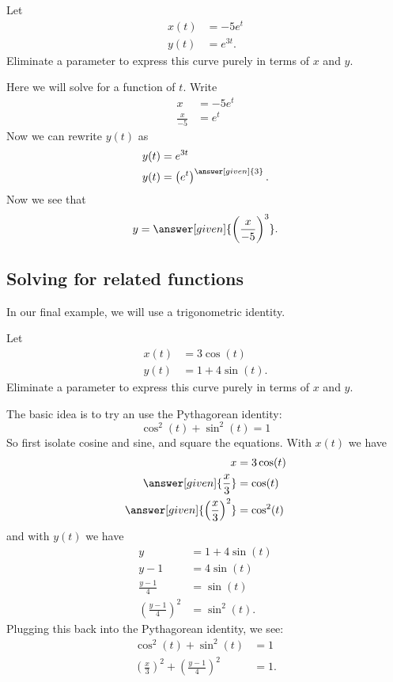 \documentclass{ximera}
\begin{document}
\begin{example}
  Let
  \begin{align*}
    x(t) &= -5e^t\\
    y(t) &= e^{3t}.
  \end{align*}
    Eliminate a parameter to express this curve purely in terms of $x$
    and $y$.
    \begin{explanation}
      Here we will solve for a function of $t$. Write
      \begin{align*}
        x &= -5e^t\\
        \frac{x}{-5} &= e^t
      \end{align*}
      Now we can rewrite $y(t)$ as
      \begin{align*}
        y(t) &= e^{3t}\\
        y(t) &= \left(e^{t}\right)^{\answer[given]{3}}.
      \end{align*}
      Now we see that
      \[
      y = \answer[given]{\left(\frac{x}{-5}\right)^3}.
      \]
  \end{explanation}
\end{example}


\subsection{Solving for related functions}

In our final example, we will use a trigonometric identity.

\begin{example}
  Let
  \begin{align*}
    x(t) &= 3\cos(t)\\
    y(t) &= 1+4\sin(t).
  \end{align*}
  Eliminate a parameter to express this curve purely in terms of $x$ and $y$.
  \begin{explanation}
    The basic idea is to try an use the Pythagorean identity:
    \[
    \cos^2(t) + \sin^2(t) = 1
    \]
    So first isolate cosine and sine, and square the equations. With $x(t)$ we have
    \begin{align*}
      x &= 3 \cos(t) \\
      \answer[given]{\frac{x}{3}} &= \cos(t)\\
      \answer[given]{\left(\frac{x}{3}\right)^2} &= \cos^2(t)
    \end{align*}
    and with $y(t)$ we have
    \begin{align*}
      y &= 1 + 4\sin(t)\\
      y-1 &= 4\sin(t)\\
      \frac{y-1}{4} &= \sin(t)\\
      \left(\frac{y-1}{4}\right)^2 &= \sin^2(t).
    \end{align*}
    Plugging this back into the Pythagorean identity, we see:
    \begin{align*}
      \cos^2(t) + \sin^2(t) &= 1\\
      \left(\frac{x}{3}\right)^2 + \left(\frac{y-1}{4}\right)^2 &= 1.
    \end{align*}
  \end{explanation}
\end{example}
\end{document}
